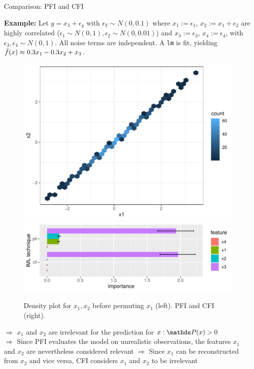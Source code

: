 \documentclass[11pt,compress,t,notes=noshow, aspectratio=169, xcolor=table]{beamer}
\begin{document}
\begin{vbframe}{Comparison: PFI and CFI}
 
 \textbf{Example:} Let $y = x_3 + \epsilon_y$ with $\epsilon_Y \sim N(0, 0.1)$ where $x_1 :=  \epsilon_1$, $x_2 := x_1 + \epsilon_2$ are highly correlated ($\epsilon_1 \sim N(0,1), \epsilon_2 \sim N(0, 0.01)$) and $x_3 := \epsilon_3$, $x_4 := \epsilon_4$,  with $\epsilon_3, \epsilon_4 \sim N(0,1)$. All noise terms are independent.
A \texttt{lm} is fit, yielding $\fh(x) \approx 0.3 x_1 - 0.3 x_2 + x_3$.\\
\begin{figure}
\hfill
  \includegraphics[width=0.25\linewidth]{figure_man/pfi_hexbin_pre.pdf}\hfill
  \includegraphics[width=0.6\linewidth]{figure_man/cfi_pfi.pdf} \hfill
  \caption{Density plot for $x_1, x_2$ before permuting $x_1$ (left). PFI and CFI (right).}
\end{figure}
% 
$\Rightarrow$ $x_1$ and $x_2$ are irrelevant for the prediction for $x: \P(x) > 0$ \\
$\Rightarrow$ Since PFI evaluates the model on unrealistic observations, the features $x_1$ and $x_2$ are nevertheless considered relevant
$\Rightarrow$ Since $x_1$ can be reconstructed from $x_2$ and vice versa, CFI considers $x_1$ and $x_2$ to be irrelevant

 \end{vbframe}


\endlecture
\end{document}
